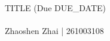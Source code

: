 \documentclass{article}
\theoremstyle{definition}\newmdtheoremenv[style = light]{exercise}{Exercise}[subsection]
\theoremstyle{definition}\newmdtheoremenv[style = light]{exerciseUnnumbered}{Exercise\!\!}
\begin{document}
    \begin{center}
        \large{TITLE (Due DUE_DATE)}\\\ \\
        \normalsize{Zhaoshen Zhai | 261003108}
    \end{center}

    \setcounter{section}{0}
    \setcounter{subsection}{0}
    \setcounter{exercise}{0}

    \begin{exercise}
        
    \end{exercise}
    \begin{solution}
        
    \end{solution}
\end{document}
